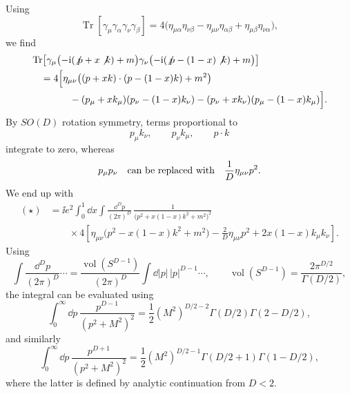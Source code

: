 Using
\[
  \operatorname{Tr}[
    \gamma_\mu\gamma_\alpha\gamma_\nu\gamma_\beta]
  =
  4\bigl(
    \eta_{\mu\alpha}\eta_{\nu\beta}
    -\eta_{\mu\nu}\eta_{\alpha\beta}
    +\eta_{\mu\beta}\eta_{\nu\alpha}
  \bigr),
\]
we find
\[
\begin{aligned}
  &\operatorname{Tr}\!\left[
    \gamma_\mu\bigl(-\mathrm{i}(\not p+x\not k)+m\bigr)
    \gamma_\nu\bigl(-\mathrm{i}(\not p-(1-x)\not k)+m\bigr)
  \right]
\\
  &\quad =
  4\Bigl[
    \eta_{\mu\nu}
      \bigl((p+xk)\cdot(p-(1-x)k)+m^2\bigr)
\\
  &\qquad\qquad
    -(p_\mu+xk_\mu)(p_\nu-(1-x)k_\nu)
    -(p_\nu+xk_\nu)(p_\mu-(1-x)k_\mu)
  \Bigr].
\end{aligned}
\]
By \(SO(D)\) rotation symmetry, terms proportional to
\[
  p_\mu k_\nu,\qquad p_\nu k_\mu,\qquad p\cdot k
\]
integrate to zero, whereas
\[
  p_\mu p_\nu
  \quad\hbox{can be replaced with}\quad
  \frac{1}{D}\eta_{\mu\nu}p^2.
\]
We end up with
\[
\begin{aligned}
  (\star)
  &=
  \ii e^2\int_0^1\dd x
  \int\frac{\dd^Dp}{(2\pi)^D}\,
  \frac{1}{\bigl(p^2+x(1-x)k^2+m^2\bigr)^2}
\\
  &\qquad\times
  4\left[
    \eta_{\mu\nu}\bigl(p^2-x(1-x)k^2+m^2\bigr)
    -\frac{2}{D}\eta_{\mu\nu}p^2
    +2x(1-x)k_\mu k_\nu
  \right].
\end{aligned}
\]
Using
\[
  \int\frac{\dd^Dp}{(2\pi)^D}\cdots
  =
  \frac{\operatorname{vol}(S^{D-1})}{(2\pi)^D}
  \int\dd|p|\,|p|^{D-1}\cdots,
  \qquad
  \operatorname{vol}(S^{D-1})
  =
  \frac{2\pi^{D/2}}{\Gamma(D/2)},
\]
the integral can be evaluated using
\[
  \int_0^\infty\dd p\,
  \frac{p^{D-1}}{(p^2+M^2)^2}
  =
  \frac12(M^2)^{D/2-2}
  \Gamma(D/2)\Gamma(2-D/2),
\]
and similarly
\[
  \int_0^\infty\dd p\,
  \frac{p^{D+1}}{(p^2+M^2)^2}
  =
  \frac12(M^2)^{D/2-1}
  \Gamma(D/2+1)\Gamma(1-D/2),
\]
where the latter is defined by analytic continuation from \(D<2\).

